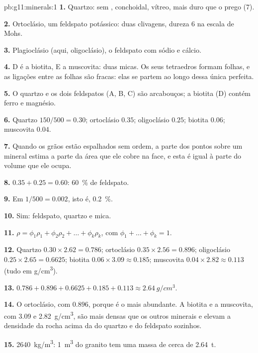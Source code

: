 \begin{solution}{pb:g11:minerals:1}
\textbf{1.} Quartzo: sem ,  conchoidal,  vítreo, mais
duro que o prego (7).

\textbf{2.} Ortoclásio, um feldspato potássico: duas clivagens, dureza 6 na
escala de Mohs.

\textbf{3.} Plagioclásio (aqui, oligoclásio), o feldspato com sódio e
cálcio.

\textbf{4.} D é a biotita, E a muscovita: duas micas. Os seus tetraedros
formam folhas, e as ligações entre as folhas são fracas: elas se partem ao
longo dessa única  perfeita.

\textbf{5.} O quartzo e os dois feldspatos (A, B, C) são arcabouços; a
biotita (D) contém ferro e magnésio.

\textbf{6.} Quartzo $150/500 = 0.30$; ortoclásio $0.35$; oligoclásio $0.25$;
biotita $0.06$; muscovita $0.04$.

\textbf{7.} Quando os grãos estão espalhados sem ordem, a parte dos pontos
sobre um mineral estima a parte da área que ele cobre na face, e esta é
igual à parte do volume que ele ocupa.

\textbf{8.} $0.35 + 0.25 = 0.60$: \qty{60}{\percent} de feldspato.

\textbf{9.} Em $1/500 = 0.002$, isto é, \qty{0.2}{\percent}.

\textbf{10.} Sim: feldspato, quartzo e mica.

\textbf{11.} $\rho = \phi_1 \rho_1 + \phi_2 \rho_2 + \dots + \phi_k \rho_k$,
com $\phi_1 + \dots + \phi_k = 1$.

\textbf{12.} Quartzo $0.30 \times 2.62 = 0.786$; ortoclásio $0.35 \times 2.56 =
0.896$; oligoclásio $0.25 \times 2.65 = 0.6625$; biotita $0.06 \times 3.09
\approx 0.185$; muscovita $0.04 \times 2.82 \approx 0.113$ (tudo em
\unit{g/cm^3}).

\textbf{13.} $0.786 + 0.896 + 0.6625 + 0.185 + 0.113 \approx
\qty{2.64}{g/cm^3}$.

\textbf{14.} O ortoclásio, com $0.896$, porque é o mais abundante. A biotita
e a muscovita, com \qty{3.09}{} e \qty{2.82}{g/cm^3}, são mais densas que os
outros minerais e elevam a densidade da rocha acima da do quartzo e do
feldspato sozinhos.

\textbf{15.} \qty{2640}{kg/m^3}: \qty{1}{m^3} do granito tem uma massa de
cerca de \qty{2.64}{t}.


\end{solution}
